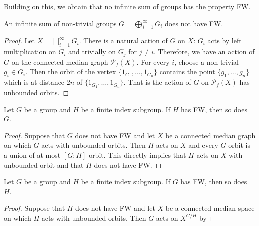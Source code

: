 Building on this, we obtain that no infinite sum of groups has the property FW.
\begin{lem}\label{Lemma:Sum}
An infinite sum of non-trivial groups $G=\bigoplus_{i=1}^\infty G_i$ does not have FW.
\end{lem}
\begin{proof}
Let $X=\bigsqcup_{i=1}^\infty G_i$.
There is a natural action of $G$ on $X$: $G_i$ acts by left multiplication on $G_i$ and trivially on $G_j$ for $j\neq i$.
Therefore, we have an action of $G$ on the connected median graph $\mathcal P_f(X)$.
For every $i$, choose a non-trivial $g_i\in G_i$.
Then the orbit of the vertex $\{1_{G_1},\dots, 1_{G_n}\}$ contains the point $\{g_1,\dots, g_n\}$ which is at distance $2n$ of $\{1_{G_1},\dots, 1_{G_n}\}$.
That is the action of $G$ on $\mathcal P_f(X)$ has unbounded orbits.
\end{proof}

\begin{lem}\label{Lemma:Subgroup}
Let $G$ be a group and $H$ be a finite index subgroup.
If $H$ has FW, then so does~$G$.
\end{lem}
\begin{proof}
Suppose that $G$ does not have FW and let $X$ be a connected median graph on which $G$ acts with unbounded orbits.
Then $H$ acts on $X$ and every $G$-orbit is a union of at most $[G:H]$ orbit. This directly implies that $H$ acts on $X$ with unbounded orbit and that $H$ does not have FW.
\end{proof}
\begin{lem}
Let $G$ be a group and $H$ be a finite index subgroup.
If $G$ has FW, then so does~$H$.
\end{lem}
\begin{proof}
Suppose that $H$ does not have FW and let $X$ be a connected median space on which $H$ acts with unbounded orbits.
Then $G$ acts on $X^{G/H}$ by 
\end{proof}

